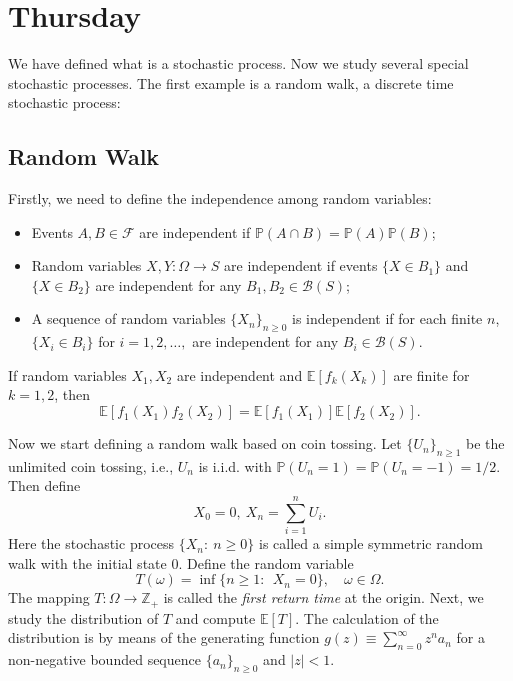 
\section{Thursday}

We have defined what is a stochastic process.
Now we study several special stochastic processes.
The first example is a random walk, a discrete time stochastic process:

\subsection{Random Walk}
Firstly, we need to define the independence among random variables:
\begin{definition}[Independence]
\begin{itemize}
\item
Events $A,B\in\mathcal{F}$ are independent if $\mathbb{P}(A\cap B) = \mathbb{P}(A)\mathbb{P}(B)$;
\item
Random variables $X,Y: \Omega\to S$ are independent if events $\{X\in B_1\}$ and $\{X\in B_2\}$ are independent for any $B_1,B_2\in\mathcal{B}(S)$;
\item
A sequence of random variables $\{X_n\}_{n\ge0}$ is independent if for 
each finite $n$, $\{X_i\in B_i\}$ for $i=1,2,\dots,$ are independent for any $B_i\in\mathcal{B}(S)$.
\end{itemize}
\end{definition}
\begin{remark}
If random variables $X_1,X_2$ are independent and $\mathbb{E}[f_k(X_k)]$ are finite for $k=1,2$, then
\[
\mathbb{E}[f_1(X_1)f_2(X_2)] = \mathbb{E}[f_1(X_1)]\mathbb{E}[f_2(X_2)].
\]
\end{remark}
Now we start defining a random walk based on coin tossing.
Let $\{U_n\}_{n\ge1}$ be the unlimited coin tossing, i.e., 
$U_n$ is i.i.d. with $\mathbb{P}(U_n=1)=\mathbb{P}(U_n=-1)=1/2$.
Then define 
\[
X_0=0,~
X_n = \sum_{i=1}^nU_i.
\]
Here the stochastic process $\{X_n:~n\ge0\}$ is called a simple symmetric random walk with the initial state $0$.
Define the random variable 
\[
T(\omega) = \inf\{n\ge1:~~X_n=0\},\quad\omega\in\Omega.
\]
The mapping $T:\Omega\to\mathbb{Z}_{+}$ is called the \emph{first return time} at the origin.
Next, we study the distribution of $T$ and compute $\mathbb{E}[T]$.
The calculation of the distribution is by means of the generating function
$g(z)\equiv \sum_{n=0}^\infty z^na_n$ for a non-negative bounded sequence $\{a_n\}_{n\ge0}$ and $|z|<1$.


